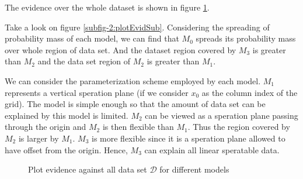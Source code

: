 \documentclass[12pt]{article}
\newenvironment{question}[2][Question]{\begin{trivlist}
\kern10pt
\item[\hskip \labelsep {\bfseries #1}\hskip \labelsep {\bfseries #2.}]}{\end{trivlist}}
\begin{document}
\begin{question}{22}
The evidence over the whole dataset is shown in figure \ref{fig:PlotEvid}.

Take a look on figure \ref{subfig-2:plotEvidSub}.
Considering the spreading of probability mass of each model, we can find that
$M_0$ spreads its probability mass over whole region of data set. And the dataset
region covered by $M_3$ is greater than $M_2$ and the data set region of $M_2$ 
is greater than $M_1$.

We can consider the parameterization scheme employed by each model. 
$M_1$ represents
a vertical speration plane (if we consider $x_0$ as the column index of the grid).
The model is simple enough so that the amount of data set can be explained by this
model is limited. 
$M_2$ can be viewed as a speration plane passing through the origin and $M_2$ is then 
flexible than $M_1$. Thus the region covered by $M_2$ is larger by $M_1$.
$M_3$ is more flexible since it is a speration plane allowed to have offset from the
origin. Hence, $M_3$ can explain all linear speratable data.

\begin{figure}[h]
  \hfill
  \caption{Plot evidence against all data set $\mathcal{D}$ for different models}
  \label{fig:PlotEvid}
\end{figure}
\end{question}
\end{document}
